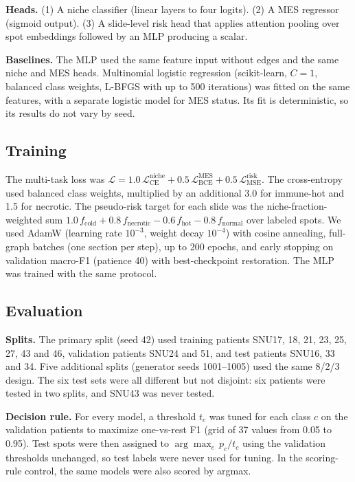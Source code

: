 \documentclass[11pt,letterpaper]{article}
\begin{document}
\textbf{Heads.} (1) A niche classifier (linear layers to four logits). (2) A MES regressor (sigmoid output). (3) A slide-level risk head that applies attention pooling over spot embeddings followed by an MLP producing a scalar.

\textbf{Baselines.} The MLP used the same feature input without edges and the same niche and MES heads. Multinomial logistic regression (scikit-learn, $C = 1$, balanced class weights, L-BFGS with up to 500 iterations) was fitted on the same features, with a separate logistic model for MES status. Its fit is deterministic, so its results do not vary by seed.

\subsection{Training}

The multi-task loss was $\mathcal{L} = 1.0\,\mathcal{L}_\mathrm{CE}^\mathrm{niche} + 0.5\,\mathcal{L}_\mathrm{BCE}^\mathrm{MES} + 0.5\,\mathcal{L}_\mathrm{MSE}^\mathrm{risk}$. The cross-entropy used balanced class weights, multiplied by an additional 3.0 for immune-hot and 1.5 for necrotic. The pseudo-risk target for each slide was the niche-fraction-weighted sum $1.0\,f_\mathrm{cold} + 0.8\,f_\mathrm{necrotic} - 0.6\,f_\mathrm{hot} - 0.8\,f_\mathrm{normal}$ over labeled spots. We used AdamW (learning rate $10^{-3}$, weight decay $10^{-4}$) with cosine annealing, full-graph batches (one section per step), up to 200 epochs, and early stopping on validation macro-F1 (patience 40) with best-checkpoint restoration. The MLP was trained with the same protocol.

\subsection{Evaluation}

\textbf{Splits.} The primary split (seed 42) used training patients SNU17, 18, 21, 23, 25, 27, 43 and 46, validation patients SNU24 and 51, and test patients SNU16, 33 and 34. Five additional splits (generator seeds 1001--1005) used the same 8/2/3 design. The six test sets were all different but not disjoint: six patients were tested in two splits, and SNU43 was never tested.

\textbf{Decision rule.} For every model, a threshold $t_c$ was tuned for each class $c$ on the validation patients to maximize one-vs-rest F1 (grid of 37 values from 0.05 to 0.95). Test spots were then assigned to $\arg\max_c\, p_c / t_c$ using the validation thresholds unchanged, so test labels were never used for tuning. In the scoring-rule control, the same models were also scored by argmax.
\end{document}
